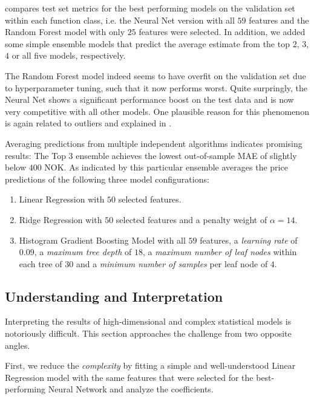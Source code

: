  compares test set metrics for the best performing models on the validation set within each function class, i.e. the Neural Net version with all $59$ features and the Random Forest model with only $25$ features were selected.
In addition, we added some simple ensemble models that predict the average estimate from the top $2$, $3$, $4$ or all five models, respectively.

The Random Forest model indeed seems to have overfit on the validation set due to hyperparameter tuning, such that it now performs worst.
Quite surpringly, the Neural Net shows a significant performance boost on the test data and is now very competitive with all other models.
One plausible reason for this phenomenon is again related to outliers and explained in .

Averaging predictions from multiple independent algorithms indicates promising results:
The Top $3$ ensemble achieves the lowest out-of-sample MAE of slightly below $400$ NOK.
As indicated by  this particular ensemble averages the price predictions of the following three model configurations:
\begin{enumerate}
  \item Linear Regression with $50$ selected features.
  \item Ridge Regression with $50$ selected features and a penalty weight of $\alpha = 14$.
  \item Histogram Gradient Boosting Model with all $59$ features, a \emph{learning rate} of $0.09$, a \emph{maximum tree depth} of $18$, a \emph{maximum number of leaf nodes} within each tree of $30$ and a \emph{minimum number of samples} per leaf node of $4$.
\end{enumerate}




\subsection{Understanding and Interpretation}

Interpreting the results of high-dimensional and complex statistical models is notoriously difficult.
This section approaches the challenge from two opposite angles.

First, we reduce the \emph{complexity} by fitting a simple and well-understood Linear Regression model with the same features that were selected for the best-performing Neural Network and analyze the coefficients.

